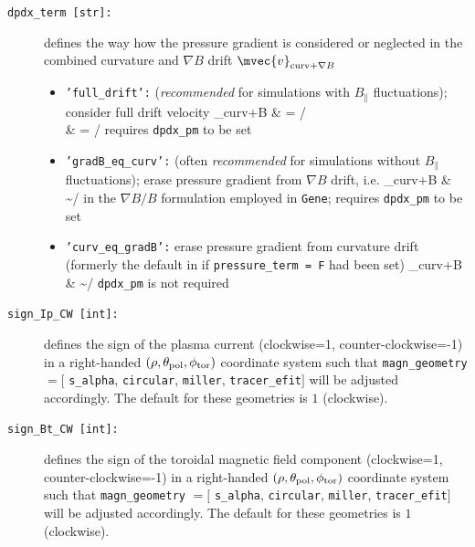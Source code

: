 \documentclass[12pt]{article}
\begin{document}
\begin{description}
\item[\hypertarget{dpdx_term}{\tt dpdx\_term [str]:}] defines the way how the pressure gradient is considered or neglected in the
combined curvature and $\nabla B$ drift $\mvec{v}_{{\rm curv}+\nabla B}$
\begin{itemize}
 \item {\tt 'full\_drift':} ({\em recommended} for simulations with $B_\|$ fluctuations); consider full drift velocity
 \bea
 _{{\rm curv}+\nabla B} & = \times{}/\Omega \nn \\
 & = \times{}/\Omega \nn
 \eea
 requires {\tt dpdx\_pm} to be set
 \item {\tt 'gradB\_eq\_curv':} (often {\em recommended} for simulations without $B_\|$ fluctuations); erase pressure gradient from $\nabla B$ drift, i.e.
 \bea
 _{{\rm curv}+\nabla B} & \sim {}\times{}/\Omega \nn
 \eea
 in the $\nabla B/B$ formulation employed in {\tt Gene}; requires {\tt dpdx\_pm} to be set
 \item {\tt 'curv\_eq\_gradB':} erase pressure gradient from curvature drift (formerly the default in \gene if {\tt pressure\_term = F} had been set)
 \bea
 _{{\rm curv}+\nabla B} & \sim {}\times{}/\Omega \nn
 \eea
 {\tt dpdx\_pm} is not required
\end{itemize}
\item[\hypertarget{sign_Ip_CW}{\tt sign\_Ip\_CW [int]:}] defines the sign of the plasma current (clockwise=1, counter-clockwise=-1) in a right-handed $(\rho,\theta_{\rm pol},\phi_{\rm tor})$ coordinate system such that {\tt magn\_geometry} $=[$ {\tt s\_alpha}, {\tt circular}, {\tt miller}, {\tt tracer\_efit}$]$ will be adjusted accordingly. The default for these geometries is $1$ (clockwise).
\item[\hypertarget{sign_Bt_CW}{\tt sign\_Bt\_CW [int]:}] defines the sign of the toroidal magnetic field component (clockwise=1, counter-clockwise=-1) in a right-handed $(\rho,\theta_{\rm pol},\phi_{\rm tor})$ coordinate system such that {\tt magn\_geometry} $=[$ {\tt s\_alpha}, {\tt circular}, {\tt miller}, {\tt tracer\_efit}$]$ will be adjusted accordingly. The default for these geometries is $1$ (clockwise).


\end{description}
\end{document}
